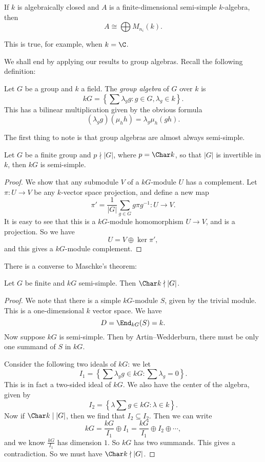 \documentclass[a4paper]{article}
\begin{document}
\begin{cor}
  If $k$ is algebraically closed and $A$ is a finite-dimensional semi-simple $k$-algebra, then
  \[
    A \cong \bigoplus M_{n_i}(k).
  \]
\end{cor}
This is true, for example, when $k = \C$.

We shall end by applying our results to group algebras. Recall the following definition:
\begin{defi}
  Let $G$ be a group and $k$ a field. The \emph{group algebra} of $G$ over $k$ is
  \[
    kG = \left\{\sum \lambda_g g: g \in G, \lambda_g \in k\right\}.
  \]
  This has a bilinear multiplication given by the obvious formula
  \[
    (\lambda_g g) (\mu_h h) = \lambda_g \mu_h (gh).
  \]
\end{defi}

The first thing to note is that group algebras are almost always semi-simple.
\begin{thm}
  Let $G$ be a finite group and $p \nmid |G|$, where $p = \Char k$, so that $|G|$ is invertible in $k$, then $kG$ is semi-simple.
\end{thm}

\begin{proof}
  We show that any submodule $V$ of a $kG$-module $U$ has a complement. Let $\pi: U \to V$ be any $k$-vector space projection, and define a new map
  \[
    \pi' = \frac{1}{|G|} \sum_{g \in G} g\pi g^{-1}: U \to V.
  \]
  It is easy to see that this is a $kG$-module homomorphism $U \to V$, and is a projection. So we have
  \[
    U = V \oplus \ker \pi',
  \]
  and this gives a $kG$-module complement.
\end{proof}

There is a converse to Maschke's theorem:
\begin{thm}
  Let $G$ be finite and $kG$ semi-simple. Then $\Char k \nmid |G|$.
\end{thm}

\begin{proof}
  We note that there is a simple $kG$-module $S$, given by the trivial module. This is a one-dimensional $k$ vector space. We have
  \[
    D = \End_{kG}(S) = k.
  \]
  Now suppose $kG$ is semi-simple. Then by Artin--Wedderburn, there must be only one summand of $S$ in $kG$.

  Consider the following two ideals of $kG$: we let
  \[
    I_1 = \left\{\sum \lambda_g g \in kG: \sum \lambda_g = 0\right\}.
  \]
  This is in fact a two-sided ideal of $kG$. We also have the center of the algebra, given by
  \[
    I_2 = \left\{\lambda \sum g \in kG: \lambda \in k\right\}.
  \]
  Now if $\Char k \mid |G|$, then we find that $I_2 \subseteq I_2$. Then we can write
  \[
    kG = \frac{kG}{I_1} \oplus I_1 = \frac{kG}{I_1} \oplus I_2 \oplus \cdots,
  \]
  and we know $\frac{kG}{I_1}$ has dimension $1$. So $kG$ has two summands. This gives a contradiction. So we must have $\Char k \nmid |G|$.
\end{proof}
\end{document}
